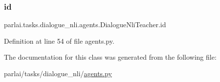 \subsubsection{\texorpdfstring{id}{id}}
{\footnotesize\ttfamily parlai.\+tasks.\+dialogue\+\_\+nli.\+agents.\+Dialogue\+Nli\+Teacher.\+id}



Definition at line 54 of file agents.\+py.



The documentation for this class was generated from the following file\+:\begin{DoxyCompactItemize}
\item 
parlai/tasks/dialogue\+\_\+nli/\hyperlink{parlai_2tasks_2dialogue__nli_2agents_8py}{agents.\+py}\end{DoxyCompactItemize}
